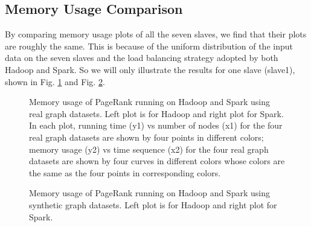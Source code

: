\documentclass[12pt,conference,letterpaper]{IEEEtran}
\begin{document}

\subsection{Memory Usage Comparison}

 By comparing memory usage plots of all the seven slaves, we find that their plots are roughly the same. This is because of the uniform distribution of the input data on the seven slaves and the load balancing strategy adopted by both Hadoop and Spark. So we will only illustrate the results for one slave (slave1), shown in Fig. \ref{fig:time_memory_real} and Fig. \ref{fig:time_memory_syn}.
 
\begin{figure}[!t]
  \centering
  \caption{Memory usage of PageRank running on Hadoop and Spark using real graph datasets. Left plot is for Hadoop and right plot for Spark. In each plot, running time (y1) vs number of nodes (x1) for the four real graph datasets are shown by four points in different colors; memory usage (y2) vs time sequence (x2) for the four real graph datasets are shown by four curves in different colors whose colors are the same as the four points in corresponding colors.}
  \label{fig:time_memory_real} 
\end{figure}

\begin{figure}[!t]
  \centering
  \caption{Memory usage of PageRank running on Hadoop and Spark using synthetic graph datasets. Left plot is for Hadoop and right plot for Spark.}
  \label{fig:time_memory_syn} 
\end{figure}
\end{document}
